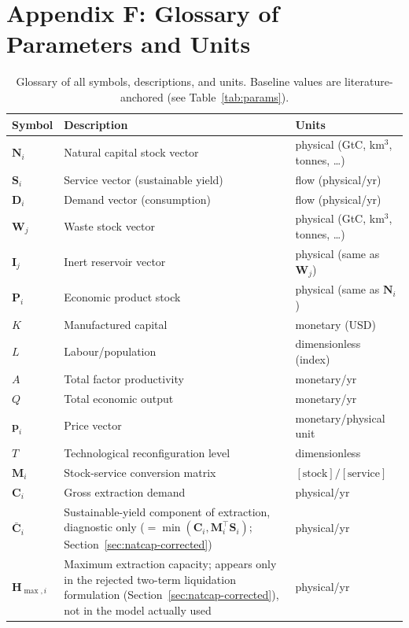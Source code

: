 \documentclass[twocolumn,10pt]{article}
\begin{document}
\section{Appendix F: Glossary of Parameters and Units}
\begin{table}[t]
\centering
\small
\caption{Glossary of all symbols, descriptions, and units. Baseline values are literature-anchored (see Table~\ref{tab:params}).}
\label{tab:glossary}
\begin{tabularx}{\textwidth}{l X l}
\toprule
\textbf{Symbol} & \textbf{Description} & \textbf{Units} \\
\midrule
\(\mathbf{N}_i\) & Natural capital stock vector & physical (GtC, km\(^3\), tonnes, \ldots) \\
\(\mathbf{S}_i\) & Service vector (sustainable yield) & flow (physical/yr) \\
\(\mathbf{D}_i\) & Demand vector (consumption) & flow (physical/yr) \\
\(\mathbf{W}_j\) & Waste stock vector & physical (GtC, km\(^3\), tonnes, \ldots) \\
\(\mathbf{I}_j\) & Inert reservoir vector & physical (same as \(\mathbf{W}_j\)) \\
\(\mathbf{P}_i\) & Economic product stock & physical (same as \(\mathbf{N}_i\)) \\
\(K\) & Manufactured capital & monetary (USD) \\
\(L\) & Labour/population & dimensionless (index) \\
\(A\) & Total factor productivity & monetary/yr \\
\(Q\) & Total economic output & monetary/yr \\
\(\mathbf{p}_i\) & Price vector & monetary/physical unit \\
\(T\) & Technological reconfiguration level & dimensionless \\
\(\mathbf{M}_i\) & Stock-service conversion matrix & \([\text{stock}]/[\text{service}]\) \\
\(\mathbf{C}_i\) & Gross extraction demand & physical/yr \\
\(\bar{\mathbf{C}}_i\) & Sustainable-yield component of extraction, diagnostic only (\(=\min(\mathbf C_i,\mathbf M_i^\top\mathbf S_i)\); Section~\ref{sec:natcap-corrected}) & physical/yr \\
\(\mathbf{H}_{\max,i}\) & Maximum extraction capacity; appears only in the rejected two-term liquidation formulation (Section~\ref{sec:natcap-corrected}), not in the model actually used & physical/yr \\

\end{tabularx}
\end{table}
\end{document}
